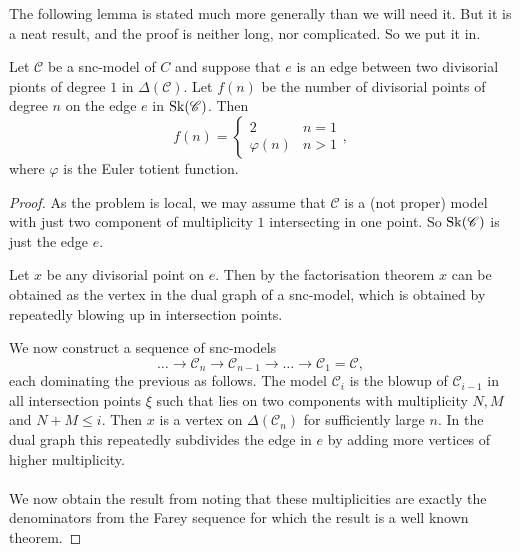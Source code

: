 The following lemma is stated much more generally than we will need it. 
But it is a neat result, and the proof is neither long, nor complicated. So we put it in. 
\begin{lemma}\label{lem:number_divisorial_points}
	Let $\mathscr C$ be a snc-model of  $C$ and suppose that $e$ is an edge between two divisorial pionts of degree $1$ in $\Delta(\mathscr C)$. 
	Let $f(n)$ be the number of divisorial points of degree $n$ on the edge  $e$ in $\operatorname{Sk}(\mathscr C)$. 
	Then \[
		f(n) = \begin{cases}
			2 & n = 1 \\
			\varphi(n) & n > 1
		\end{cases}
	,\] 
	where $\varphi$ is the Euler totient function. 
\end{lemma}
\begin{proof}
	As the problem is local, we may assume that $\mathscr C$ is a (not proper) model with just two component of multiplicity $1$ intersecting in one point. 
	So $\operatorname{Sk}(\mathscr C)$ is just the edge $e$. 

	Let $x$ be any divisorial point on $e$. 
	Then by the factorisation theorem $x$ can be obtained as the vertex in the dual graph of a snc-model, which is obtained by repeatedly blowing up in intersection points. 

	We now construct a sequence of snc-models \[
	\ldots \to 	\mathscr C_n \to \mathscr C_{n -1} \to \ldots \to \mathscr C_1 = \mathscr C
,\]
each dominating the previous as follows. 
The model  $\mathscr C_i$ is the blowup of $\mathscr C_{i-1}$ in all intersection points $\xi$ such that lies on two components with multiplicity $N, M$ and $N + M \le i$. 
Then $x$ is a vertex on $\Delta(\mathscr C_n)$ for sufficiently large $n$.
In the dual graph this repeatedly subdivides the edge in $e$ by adding more vertices of higher multiplicity. 
\\
\noindent{}
\\
We now obtain the result from noting that these multiplicities are exactly the denominators from the Farey sequence for which the result is a well known theorem. 
\end{proof}



